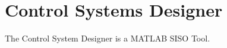 \documentclass[12pt,letter]{article}
\begin{document}
	
%	

	\setcounter{section}{9}	

\section{Control Systems Designer}

The Control System Designer is a MATLAB SISO Tool.











	\pagebreak
	\renewcommand{\thepage}{}
	\renewcommand\refname{References Cited}
	\pagestyle{plain}
	
	
\end{document}
